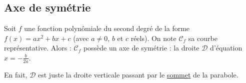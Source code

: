 	\subsection{Axe de symétrie}
	
	\begin{formula}
		Soit $f$ une fonction polynômiale du second degré de la forme $f(x) = ax^2 + bx +c$ (avec $a \neq 0$, $b$ et $c$ réels). On note $\mathcal{C}_f$ sa courbe représentative. Alors :
		\newpar
		$\mathcal{C}_f$ possède un axe de symétrie : la droite $\mathcal{D}$ d'équation $x = -\frac{b}{2a}$.
	\end{formula}
	
	\begin{tip}
		En fait, $\mathcal{D}$ est juste la droite verticale passant par le \hyperref[variations]{sommet} de la parabole.
	\end{tip}
